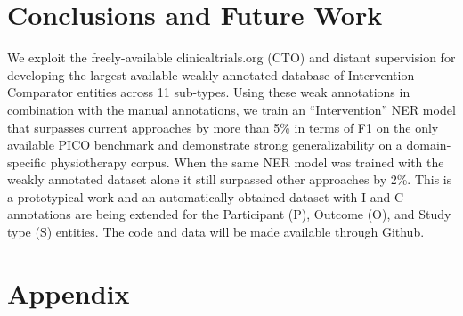 \documentclass[11pt]{article}
\begin{document}
%
%
%
\section{Conclusions and Future Work}
\label{sec:conclusion}
%
We exploit the freely-available clinicaltrials.org (CTO) and distant supervision for developing the largest available weakly annotated database of Intervention-Comparator entities across 11 sub-types.
Using these weak annotations in combination with the manual annotations, we train an ``Intervention'' NER model that surpasses current approaches by more than 5\% in terms of F1 on the only available PICO benchmark and demonstrate strong generalizability on a domain-specific physiotherapy corpus.
When the same NER model was trained with the weakly annotated dataset alone it still surpassed other approaches by 2\%.
This is a prototypical work and an automatically obtained dataset with I and C annotations are being extended for the Participant (P), Outcome (O), and Study type (S) entities.
The code and data will be made available through Github.
%
%




\appendix

\section{Appendix}
\label{sec:appendix}
%
\end{document}
